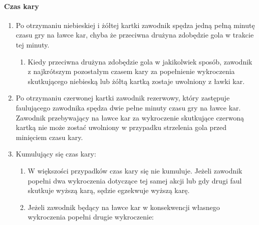 \documentclass[12pt]{article}
\begin{document}
\paragraph{Czas kary}

\begin{enumerate}
	\item Po otrzymaniu niebieskiej i żółtej kartki zawodnik spędza jedną
	      pełną minutę czasu gry na ławce kar, chyba że przeciwna drużyna
	      zdobędzie gola w trakcie tej minuty.

	      \begin{enumerate}
		      \item
		            Kiedy przeciwna drużyna zdobędzie gola w jakikolwiek sposób,
		            zawodnik z najkrótszym pozostałym czasem kary za popełnienie
		            wykroczenia skutkującego niebieską lub żółtą kartką zostaje
		            uwolniony z ławki kar.
	      \end{enumerate}
	\item
	      Po otrzymaniu czerwonej kartki zawodnik rezerwowy, który zastępuje
	      faulującego zawodnika spędza dwie pełne minuty czasu gry na ławce kar.
	      Zawodnik przebywający na ławce kar za wykroczenie skutkujące czerwoną
	      kartką nie może zostać uwolniony w przypadku strzelenia gola przed
	      minięciem czasu kary.
	\item
	      Kumulujący się czas kary:

	      \begin{enumerate}
		      \item
		            W większości przypadków czas kary się nie kumuluje. Jeżeli zawodnik
		            popełni dwa wykroczenia dotyczące tej samej akcji lub gdy drugi faul
		            skutkuje wyższą karą, sędzie egzekwuje wyższą karę.
		      \item
		            Jeżeli zawodnik będący na ławce kar w konsekwencji własnego
		            wykroczenia popełni drugie wykroczenie:


\end{enumerate}
\end{enumerate}
\end{document}
